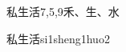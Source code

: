 \begin{entry}{私生活}{7,5,9}{⽲、⽣、⽔}
  \begin{phonetics}{私生活}{si1sheng1huo2}
  \end{phonetics}
\end{entry}
